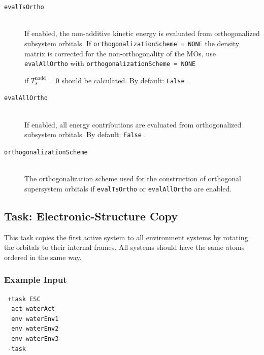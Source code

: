 \documentclass[bibliography=totocnumbered,a4paper,10pt,oneside]{scrbook}
\newcommand{\ttt}[1]{%
  \begingroup\setlength{\fboxsep}{1pt}%
  \colorbox{serenity-green!30}{\texttt{\hspace*{2pt}\vphantom{(g}#1\hspace*{2pt}}}%
  \endgroup
}
\begin{document}
\begin{description}
	\item [\texttt{evalTsOrtho}]\hfill \\
    If enabled, the non-additive kinetic energy is evaluated from orthogonalized subsystem 
    orbitals. If \ttt{orthogonalizationScheme = NONE} the density matrix is corrected for
    the non-orthogonality of the MOs, use \ttt{evalAllOrtho} with \ttt{orthogonalizationScheme = NONE} 
    if $T_s^\text{nadd}=0$ should be calculated. By default: \ttt{False}.
    \item [\texttt{evalAllOrtho}]\hfill \\
    If enabled, all energy contributions are evaluated from orthogonalized subsystem orbitals.
    By default: \ttt{False}.
    \item [\texttt{orthogonalizationScheme}]\hfill \\ The orthogonalization scheme used
    for the construction of orthogonal supersystem orbitals if \ttt{evalTsOrtho} or \ttt{evalAllOrtho} are enabled.
\end{description}

\subsection{Task: Electronic-Structure Copy}
This task copies the first active system to all environment systems by rotating the
orbitals to their internal frames. All systems should have the same atoms ordered
in the same way.
\subsubsection{Example Input}
\begin{lstlisting}
 +task ESC
  act waterAct
  env waterEnv1
  env waterEnv2
  env waterEnv3
 -task
\end{lstlisting}
\end{document}
